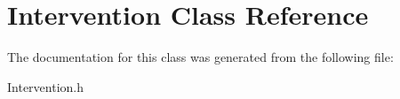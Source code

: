 \hypertarget{classIntervention}{}\section{Intervention Class Reference}
\label{classIntervention}


The documentation for this class was generated from the following file\+:\begin{DoxyCompactItemize}
\item 
Intervention.\+h\end{DoxyCompactItemize}
